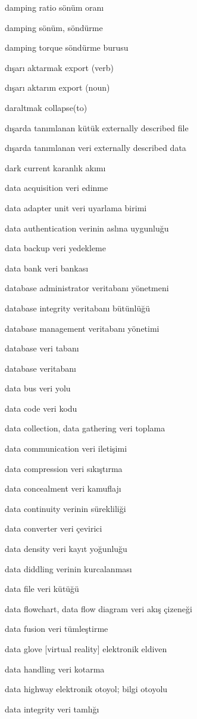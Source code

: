 \documentclass[12pt,fleqn]{article}\usepackage{../../common}
\begin{document}
damping ratio sönüm oranı

damping sönüm, söndürme

damping torque söndürme burusu

dışarı aktarmak export (verb)

dışarı aktarım export (noun)

daraltmak collapse(to)

dışarda tanımlanan kütük externally described file

dışarda tanımlanan veri externally described data

dark current karanlık akımı

data acquisition veri edinme

data adapter unit veri uyarlama birimi

data authentication verinin aslına uygunluğu

data backup veri yedekleme

data bank veri bankası

database administrator veritabanı yönetmeni

database integrity veritabanı bütünlüğü

database management veritabanı yönetimi

database veri tabanı

database veritabanı

data bus veri yolu

data code veri kodu

data collection, data gathering veri toplama

data communication veri iletişimi

data compression veri sıkıştırma

data concealment veri kamuflajı

data continuity verinin sürekliliği

data converter veri çevirici

data density veri kayıt yoğunluğu

data diddling verinin kurcalanması

data file veri kütüğü

data flowchart, data flow diagram veri akış çizeneği

data fusion veri tümleştirme

data glove [virtual reality] elektronik eldiven

data handling veri kotarma

data highway elektronik otoyol; bilgi otoyolu

data integrity veri tamlığı
\end{document}
